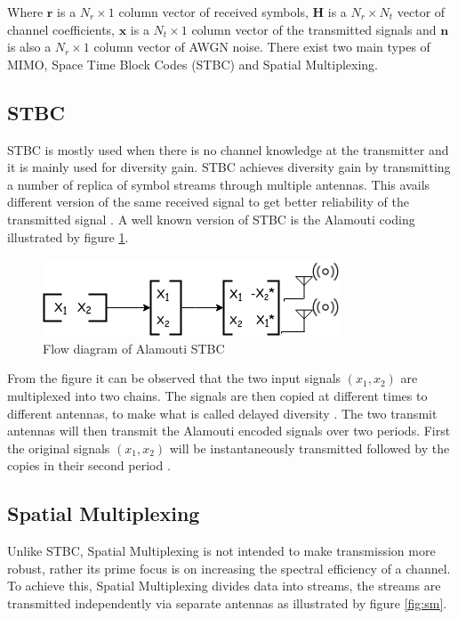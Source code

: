 \documentclass[11pt]{report}
\renewcommand{\vec}[1]{\mathbf{#1}} %
\begin{document}
Where $ \vec{r} $ is a $ N_r\times1 $ column vector of received symbols, $ \vec{H} $ is a $ N_r\times N_t $ vector of channel coefficients, $ \vec{x} $ is a $N_t\times1 $ column vector of the transmitted signals and $\vec{n}$ is also a $ N_r\times1 $ column vector of AWGN noise. There exist two main types of MIMO, Space Time Block Codes (STBC) and Spatial Multiplexing.

\subsection{STBC}
\label{sub:stbc}
STBC is mostly used when there is no channel knowledge at the transmitter and it is mainly used for diversity gain. STBC achieves diversity gain by transmitting a number of replica of symbol streams through multiple antennas. This avails different version of the same received signal to get better reliability of the transmitted signal \cite{14}. A well known version of STBC is the Alamouti coding illustrated by figure \ref{fig:al}.

\begin{figure}[h!]
	\centering
	\includegraphics[scale=0.65]{resources/al.png}
	\caption{Flow diagram of Alamouti STBC}
	\label{fig:al}
\end{figure} 
From the figure it can be observed that the two input signals $(x_1, x_2)$ are multiplexed into two chains. The signals are then copied at different times to different antennas, to make what is called delayed diversity \cite{B8}. The two transmit antennas will then transmit the Alamouti encoded signals over two periods. First the original signals $(x_1,x_2)$ will be instantaneously transmitted followed by the copies in their second period \cite{14}. 

\subsection{Spatial Multiplexing}
\label{sub:sm}
Unlike STBC, Spatial Multiplexing is not intended to make transmission more robust, rather its prime focus is on increasing the spectral efficiency of a channel. To achieve this, Spatial Multiplexing divides data into streams, the streams are transmitted independently via separate antennas as illustrated by figure \ref{fig:sm}.
\end{document}
